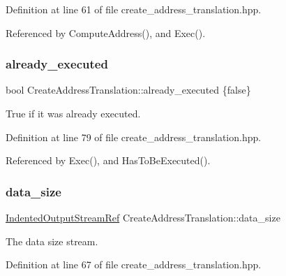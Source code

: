 Definition at line 61 of file create\+\_\+address\+\_\+translation.\+hpp.



Referenced by Compute\+Address(), and Exec().

\mbox{\label{classCreateAddressTranslation_a0d4b362eb276f1ac3362404c1501e573}} 
\subsubsection{\texorpdfstring{already\+\_\+executed}{already\_executed}}
{\footnotesize\ttfamily bool Create\+Address\+Translation\+::already\+\_\+executed \{false\}\hspace{0.3cm}{\ttfamily [protected]}}



True if it was already executed. 



Definition at line 79 of file create\+\_\+address\+\_\+translation.\+hpp.



Referenced by Exec(), and Has\+To\+Be\+Executed().

\mbox{\label{classCreateAddressTranslation_aa0fb7eb48552fe76477b714dfae993f8}} 
\subsubsection{\texorpdfstring{data\+\_\+size}{data\_size}}
{\footnotesize\ttfamily \hyperlink{indented__output__stream_8hpp_ab32278e11151ef292759c88e99b77feb}{Indented\+Output\+Stream\+Ref} Create\+Address\+Translation\+::data\+\_\+size\hspace{0.3cm}{\ttfamily [protected]}}



The data size stream. 



Definition at line 67 of file create\+\_\+address\+\_\+translation.\+hpp.



